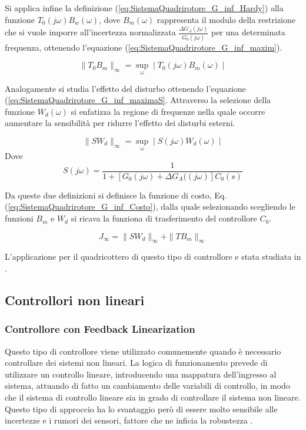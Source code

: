 Si applica infine la definizione (\ref{eq:SistemaQuadrirotore_G_inf_Hardy}) alla funzione $T_0(j \omega) B_w(\omega)$, dove $B_m(\omega)$ rappresenta il modulo della restrizione che si vuole imporre all'incertezza normalizzata $\frac{\Delta G_A(j \omega)}{G_0 (j \omega)}$ per una determinata frequenza, ottenendo l'equazione (\ref{eq:SistemaQuadrirotore_G_inf_maxim}).

\begin{equation}\label{eq:SistemaQuadrirotore_G_inf_maxim}
		\|T_0 B_m\|_\infty = \sup_\omega \mid T_0(j \omega) B_m(\omega) \mid
\end{equation}

Analogamente si studia l'effetto del disturbo ottenendo l'equazione (\ref{eq:SistemaQuadrirotore_G_inf_maximaS}. Attraverso la selezione della funzione $W_d(\omega)$ si enfatizza la regione di frequenze nella quale occorre aumentare la sensibilità per ridurre l'effetto dei disturbi esterni.

\begin{equation}\label{eq:SistemaQuadrirotore_G_inf_maximaS}
	\|S W_d\|_\infty = \sup_\omega \mid S(j \omega) W_d(\omega) \mid
\end{equation}
Dove 
\[ 
	S(j \omega) = \frac{1}{1+ \left[G_0(j \omega) + \Delta G_A((j \omega) \right]C_0(s)}
\]

Da queste due definizioni si definisce la funzione di costo, Eq. (\ref{eq:SistemaQuadrirotore_G_inf_Costo}), dalla quale selezionando scegliendo le funzioni $B_m$ e $W_d$ si ricava la funziona di trasferimento del controllore $C_0$.

\begin{equation}\label{eq:SistemaQuadrirotore_G_inf_Costo}
	J_\infty = \| S W_d \|_\infty + \| T B_m\|_\infty
\end{equation}

L'applicazione per il quadricottero di questo tipo di controllore e stata studiata in \cite{G_inf}.

\subsection{Controllori non lineari}

\subsubsection{Controllore con Feedback Linearization}

Questo tipo di controllore viene utilizzato comunemente quando è necessario controllare dei sistemi non lineari. La logica di funzionamento prevede di utilizzare un controllo lineare, introducendo una mappatura dell'ingresso al sistema, attuando di fatto un cambiamento delle variabili di controllo, in modo che il sistema di controllo lineare sia in grado di controllare il sistema non lineare.  Questo tipo di approccio ha lo svantaggio però di essere molto sensibile alle incertezze e i rumori dei sensori, fattore che ne inficia la robustezza \cite{KimJinho2020ACSo}.

